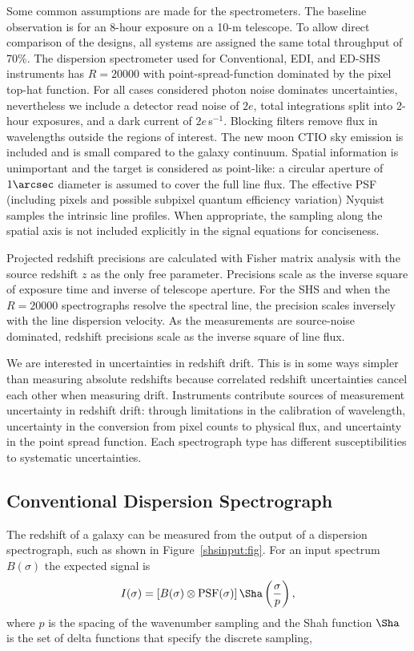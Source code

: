 \documentclass[preprint]{aastex}
\begin{document}
Some common assumptions are made for the spectrometers.
The baseline observation is for an 8-hour exposure on a 10-m telescope.
To allow direct comparison of the 
designs, all systems are assigned the same total throughput of 70\%.
The dispersion spectrometer used for Conventional, EDI, and ED-SHS instruments has $R=20000$ with
point-spread-function dominated by the pixel top-hat function.
For all cases considered photon noise dominates uncertainties, nevertheless
we include a detector read noise of $2e$, total integrations split into 2-hour exposures, and a dark current of $2e$\,s$^{-1}$. 
Blocking filters remove flux in wavelengths outside the regions
of interest.  The new moon CTIO sky emission is included and
is small compared to the galaxy continuum.
Spatial information is unimportant and the target is considered as point-like: a
circular aperture of $1\arcsec$ diameter is assumed to cover the full line flux.
The effective PSF (including pixels and possible subpixel quantum efficiency variation) 
Nyquist samples the intrinsic line profiles.
When appropriate, the sampling along the spatial axis is not included explicitly in the
signal equations for conciseness.


Projected redshift precisions are calculated with Fisher matrix analysis with the source
redshift $z$ as the only free parameter. 
Precisions scale as the inverse square of exposure time and inverse of telescope aperture. 
For the SHS and when the  $R=20000$ spectrographs resolve the spectral line, the precision scales inversely
with the line dispersion velocity.  
As the measurements
are source-noise dominated, redshift precisions scale as the inverse square of line flux. 

We are interested in uncertainties in redshift drift.  This is in some ways simpler than measuring absolute redshifts
because correlated redshift uncertainties cancel each other when measuring drift.
Instruments contribute sources of measurement uncertainty in redshift drift:  through limitations in the calibration
of wavelength,  uncertainty in the conversion from pixel counts to physical flux, and uncertainty in the point spread function.
Each spectrograph type
has different susceptibilities to  systematic uncertainties.


\subsection{Conventional Dispersion Spectrograph} 
The redshift of a galaxy can be measured from the output of a dispersion spectrograph, such as shown in Figure~\ref{shsinput:fig}.
For an input spectrum $B(\sigma)$ the expected signal is
\begin{equation}
I(\sigma) = \left[B(\sigma)\otimes \mbox{PSF}(\sigma)\right]\Sha\left(\frac{\sigma}{p}\right),
\label{conventional:eqn}
\end{equation}
where $p$ is the spacing of the wavenumber sampling and the Shah function $\Sha$ is the set of delta functions
that specify the discrete sampling,
\end{document}
